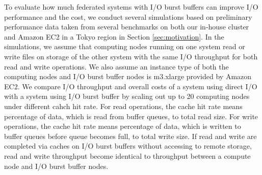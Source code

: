 To evaluate how much federated systems with I/O burst buffers can improve I/O performance and the cost, 
we conduct several simulations based on preliminary performance data taken from several 
benchmarks on both our in-house cluster and Amazon EC2 in a Tokyo region in Section \ref{sec:motivation}.%
In the simulations, we assume that computing nodes running on one system read or write files on storage of the other system with the same I/O throughput for both read and write operations.
We also assume an instance type of both the computing nodes and I/O burst buffer nodes is m3.xlarge provided by Amazon EC2.
We compare I/O throughput and overall costs of a system using direct I/O with a system using I/O burst buffer by scaling out up to 20 computing nodes
under different cahch hit rate.
For read operations, the cache hit rate means percentage of data, which is read from buffer queues, to total read size. 
For write operations, the cache hit rate means percentage of data, which is  written to buffer queues before queue becomes full, to total write size.
If read and write are completed via caches on I/O burst buffers
without accessing to remote storage, read and write throughput become 
identical to throughput between a compute node and I/O burst buffer nodes. 

	
